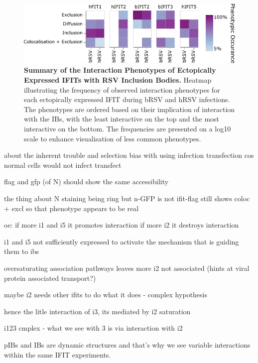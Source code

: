 \begin{figure}
    \centering
    \includegraphics[width=1\linewidth]{09. Chapter 4/Figs/heatmap-infection-transfection.pdf}
    \caption[Summary of the Interaction Phenotypes of Ectopically Expressed IFITs with RSV Inclusion Bodies.]{\textbf{Summary of the Interaction Phenotypes of Ectopically Expressed IFITs with RSV Inclusion Bodies.} Heatmap illustrating the frequency of observed interaction phenotypes for each ectopically expressed IFIT during bRSV and hRSV infections. The phenotypes are ordered based on their implication of interaction with the IBs, with the least interactive on the top and the most interactive on the bottom. The frequencies are presented on a log10 scale to enhance visualisation of less common phenotypes.}
    \label{fig:Summary of the Interaction Phenotypes of Ectopically Expressed IFITs with RSV Inclusion Bodies}
\end{figure}

about the inherent trouble and selection bias with using infection transfection cos normal cells would not infect transfect

flag and gfp (of N) should show the same accessibility

the thing about N staining being ring but n-GFP is not
ifit-flag still shows coloc + excl so that phenotype appears to be real

oe:
if more i1 and i5 it promotes interaction
if more i2 it destroys interaction


i1 and i5 not sufficiently expressed to activate the mechanism that is guiding them to ibs

oversaturating association pathways leaves more i2 not associated (hints at viral protein associated transport?)

maybe i2 needs other ifits to do what it does - complex hypothesis

hence the litle interaction of i3, its mediated by i2 saturation

i123 cmplex - what we see with 3 is via interaction with i2

pIBs and IBs are dynamic structures and that's why we see variable interactions within the same IFIT experiments.

